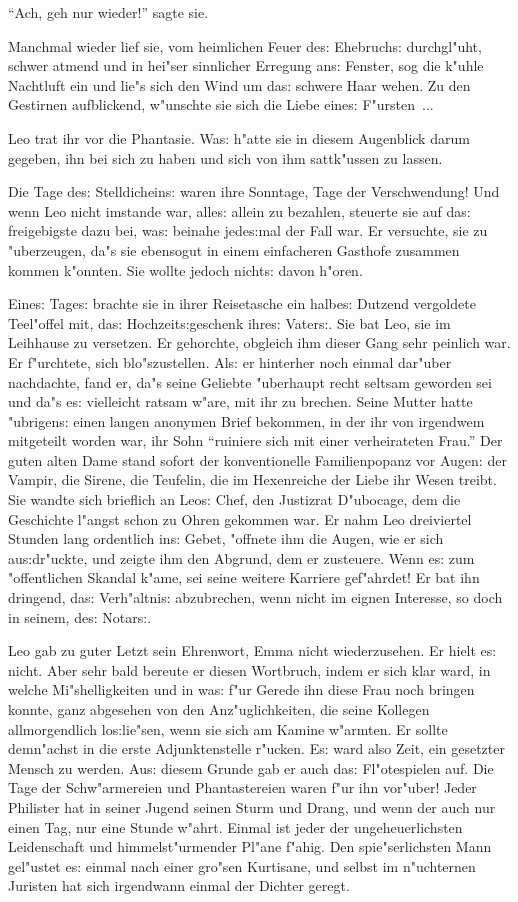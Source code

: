 \documentclass[oneside,12pt]{book}
\newcommand{\s}{s:}%
\begin{document}
"`Ach, geh nur wieder!"' sagte sie.

Manchmal wieder lief sie, vom heimlichen Feuer de{\s} Ehebruch{\s}
durch\-gl"uht, schwer atmend und in hei"ser sinnlicher Erregung
an{\s} Fenster, sog die k"uhle Nachtluft ein und lie"s sich den
Wind um da{\s} schwere Haar wehen. Zu den Gestirnen aufblickend,
w"unschte sie sich die Liebe eine{\s} F"ursten~...

Leo trat ihr vor die Phantasie. Wa{\s} h"atte sie in diesem
Augenblick darum gegeben, ihn bei sich zu haben und sich von ihm
sattk"ussen zu lassen.

Die Tage de{\s} Stelldichein{\s} waren ihre Sonntage, Tage der
Verschwendung! Und wenn Leo nicht imstande war, alle{\s} allein zu
bezahlen, steuerte sie auf da{\s} freigebigste dazu bei, wa{\s}
beinahe jede{\s}mal der Fall war. Er versuchte, sie zu
"uberzeugen, da"s sie ebensogut in einem einfacheren Gasthofe
zusammen kommen k"onnten. Sie wollte jedoch nicht{\s} davon
h"oren.

Eine{\s} Tage{\s} brachte sie in ihrer Reisetasche ein halbe{\s}
Dutzend vergoldete Teel"offel mit, da{\s} Hochzeit{\s}geschenk
ihre{\s} Vater{\s}. Sie bat Leo, sie im Leihhause zu versetzen. Er
gehorchte, obgleich ihm dieser Gang sehr peinlich war. Er
f"urchtete, sich blo"szustellen. Al{\s} er hinterher noch einmal
dar"uber nachdachte, fand er, da"s seine Geliebte "uberhaupt recht
seltsam geworden sei und da"s e{\s} vielleicht ratsam w"are, mit
ihr zu brechen. Seine Mutter hatte "ubrigen{\s} einen langen
anonymen Brief bekommen, in der ihr von irgendwem mitgeteilt
worden war, ihr Sohn "`ruiniere sich mit einer verheirateten
Frau."' Der guten alten Dame stand sofort der konventionelle
Familienpopanz vor Augen: der Vampir, die Sirene, die Teufelin,
die im Hexenreiche der Liebe ihr Wesen treibt. Sie wandte sich
brieflich an Leo{\s} Chef, den Justizrat D"ubocage, dem die
Geschichte l"angst schon zu Ohren gekommen war. Er nahm Leo
dreiviertel Stunden lang ordentlich in{\s} Gebet, "offnete ihm die
Augen, wie er sich au{\s}dr"uckte, und zeigte ihm den Abgrund, dem
er zusteuere. Wenn e{\s} zum "offentlichen Skandal k"ame, sei
seine weitere Karriere gef"ahrdet! Er bat ihn dringend, da{\s}
Verh"altni{\s} abzubrechen, wenn nicht im eignen Interesse, so
doch in seinem, de{\s} Notar{\s}.

Leo gab zu guter Letzt sein Ehrenwort, Emma nicht wiederzusehen.
Er hielt e{\s} nicht. Aber sehr bald bereute er diesen Wortbruch,
indem er sich klar ward, in welche Mi"shelligkeiten und in wa{\s}
f"ur Gerede ihn diese Frau noch bringen konnte, ganz abgesehen von
den Anz"uglichkeiten, die seine Kollegen allmorgendlich
lo{\s}lie"sen, wenn sie sich am Kamine w"armten. Er sollte
demn"achst in die erste Adjunktenstelle r"ucken. E{\s} ward also
Zeit, ein gesetzter Mensch zu werden. Au{\s} diesem Grunde gab er
auch da{\s} Fl"otespielen auf. Die Tage der Schw"armereien und
Phantastereien waren f"ur ihn vor"uber! Jeder Philister hat in
seiner Jugend seinen Sturm und Drang, und wenn der auch nur einen
Tag, nur eine Stunde w"ahrt. Einmal ist jeder der
ungeheuerlichsten Leidenschaft und himmelst"urmender Pl"ane
f"ahig. Den spie"serlichsten Mann gel"ustet e{\s} einmal nach
einer gro"sen Kurtisane, und selbst im n"uchternen Juristen hat
sich irgendwann einmal der Dichter geregt.
\end{document}
